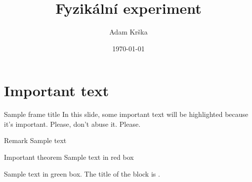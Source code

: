 \documentclass[aspectratio=1610,11pt]{beamer}
\author{Adam Krška}
\title{Fyzikální experiment}
\date{\today}
\begin{document}
\begin{frame}
\titlepage
\end{frame}



%
%
%
%
%
%

\section{Important text}

\begin{frame}{Sample frame title}
In this slide, some important text will be
\alert{highlighted} because it's important.
Please, don't abuse it. Please.

\begin{block}{Remark}
Sample text
\end{block}

\begin{alertblock}{Important theorem}
Sample text in red box
\end{alertblock}

\begin{examples}
Sample text in green box. The title of the block is .
\end{examples}
\end{frame}
\end{document}
